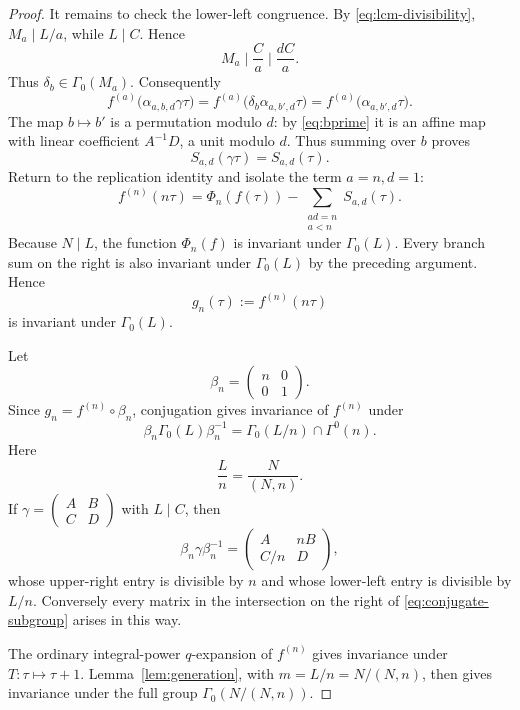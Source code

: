 \documentclass[12pt]{amsart}
\theoremstyle{definition}
\theoremstyle{remark}
\numberwithin{equation}{section}
\newcommand{\C}{\mathbb C}
\begin{document}
\begin{proof}
It remains to check the lower-left congruence. By \eqref{eq:lcm-divisibility}, $M_a\mid L/a$, while $L\mid C$. Hence
\[
M_a\mid\frac{C}{a}\mid\frac{dC}{a}.
\]
Thus $\delta_b\in\Gamma_0(M_a)$. Consequently
\[
f^{(a)}\bigl(\alpha_{a,b,d}\gamma\tau\bigr)
=
f^{(a)}\bigl(\delta_b\alpha_{a,b',d}\tau\bigr)
=
f^{(a)}\bigl(\alpha_{a,b',d}\tau\bigr).
\]
The map $b\mapsto b'$ is a permutation modulo $d$: by \eqref{eq:bprime} it is an affine map with linear coefficient $A^{-1}D$, a unit modulo $d$. Thus summing over $b$ proves
\[
S_{a,d}(\gamma\tau)=S_{a,d}(\tau).
\]
Return to the replication identity and isolate the term $a=n,d=1$:
\begin{equation}\label{eq:isolate-n-descent}
f^{(n)}(n\tau)
=
\Phi_n(f(\tau))
-
\sum_{\substack{ad=n\\a<n}}S_{a,d}(\tau).
\end{equation}
Because $N\mid L$, the function $\Phi_n(f)$ is invariant under $\Gamma_0(L)$. Every branch sum on the right is also invariant under $\Gamma_0(L)$ by the preceding argument. Hence
\[
g_n(\tau):=f^{(n)}(n\tau)
\]
is invariant under $\Gamma_0(L)$.

Let
\[
\beta_n=\begin{pmatrix}n&0\\0&1\end{pmatrix}.
\]
Since $g_n=f^{(n)}\circ\beta_n$, conjugation gives invariance of $f^{(n)}$ under
\begin{equation}\label{eq:conjugate-subgroup}
\beta_n\Gamma_0(L)\beta_n^{-1}
=
\Gamma_0(L/n)\cap\Gamma^0(n).
\end{equation}
Here
\[
\frac{L}{n}=\frac{N}{(N,n)}.
\]
If $\gamma=\left(\begin{smallmatrix}A&B\\C&D\end{smallmatrix}\right)$ with $L\mid C$, then
\[
\beta_n\gamma\beta_n^{-1}
=
\begin{pmatrix}A&nB\\C/n&D\end{pmatrix},
\]
whose upper-right entry is divisible by $n$ and whose lower-left entry is divisible by $L/n$. Conversely every matrix in the intersection on the right of \eqref{eq:conjugate-subgroup} arises in this way.

The ordinary integral-power $q$-expansion of $f^{(n)}$ gives invariance under $T:\tau\mapsto\tau+1$. Lemma~\ref{lem:generation}, with $m=L/n=N/(N,n)$, then gives invariance under the full group $\Gamma_0(N/(N,n))$.
\end{proof}
\end{document}
